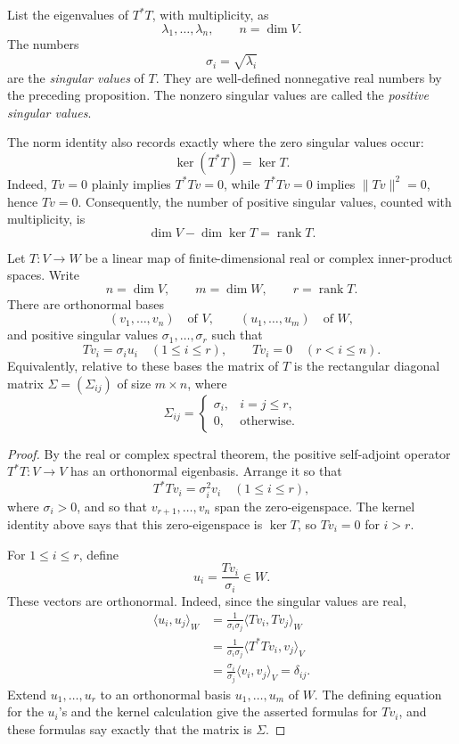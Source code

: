 \begin{definition}
List the eigenvalues of \(T^*T\), with multiplicity, as
\[
\lambda_1,\ldots,\lambda_n,
\qquad n=\dim V.
\]
The numbers
\[
\sigma_i=\sqrt{\lambda_i}
\]
are the \emph{singular values} of \(T\).  They are well-defined nonnegative
real numbers by the preceding proposition.  The nonzero singular values are
called the \emph{positive singular values}.
\end{definition}

The norm identity also records exactly where the zero singular values occur:
\[
\ker(T^*T)=\ker T.
\]
Indeed, \(Tv=0\) plainly implies \(T^*Tv=0\), while \(T^*Tv=0\) implies
\(\lVert Tv\rVert^2=0\), hence \(Tv=0\).  Consequently, the number of
positive singular values, counted with multiplicity, is
\[
\dim V-\dim\ker T=\operatorname{rank}T.
\]

\begin{theorem}
Let \(T:V\to W\) be a linear map of finite-dimensional real or complex
inner-product spaces.  Write
\[
n=\dim V,\qquad m=\dim W,\qquad r=\operatorname{rank}T.
\]
There are orthonormal bases
\[
(v_1,\ldots,v_n)\quad\text{of }V,
\qquad
(u_1,\ldots,u_m)\quad\text{of }W,
\]
and positive singular values \(\sigma_1,\ldots,\sigma_r\) such that
\[
Tv_i=\sigma_i u_i\quad(1\leq i\leq r),
\qquad
Tv_i=0\quad(r<i\leq n).
\]
Equivalently, relative to these bases the matrix of \(T\) is the rectangular
diagonal matrix \(\Sigma=(\Sigma_{ij})\) of size \(m\times n\), where
\[
\Sigma_{ij}=
\begin{cases}
\sigma_i,& i=j\leq r,\\
0,&\text{otherwise}.
\end{cases}
\]
\end{theorem}
\begin{proof}
By the real or complex spectral theorem, the positive self-adjoint operator
\(T^*T:V\to V\) has an orthonormal eigenbasis.  Arrange it so that
\[
T^*Tv_i=\sigma_i^2v_i\quad(1\leq i\leq r),
\]
where \(\sigma_i>0\), and so that \(v_{r+1},\ldots,v_n\) span the
zero-eigenspace.  The kernel identity above says that this zero-eigenspace
is \(\ker T\), so \(Tv_i=0\) for \(i>r\).

For \(1\leq i\leq r\), define
\[
u_i=\frac{Tv_i}{\sigma_i}\in W.
\]
These vectors are orthonormal.  Indeed, since the singular values are real,
\[
\begin{aligned}
\langle u_i,u_j\rangle_W
&=\frac{1}{\sigma_i\sigma_j}\langle Tv_i,Tv_j\rangle_W\\
&=\frac{1}{\sigma_i\sigma_j}\langle T^*Tv_i,v_j\rangle_V\\
&=\frac{\sigma_i}{\sigma_j}\langle v_i,v_j\rangle_V
=\delta_{ij}.
\end{aligned}
\]
Extend \(u_1,\ldots,u_r\) to an orthonormal basis
\(u_1,\ldots,u_m\) of \(W\).  The defining equation for the \(u_i\)'s and
the kernel calculation give the asserted formulas for \(Tv_i\), and these
formulas say exactly that the matrix is \(\Sigma\).
\end{proof}

